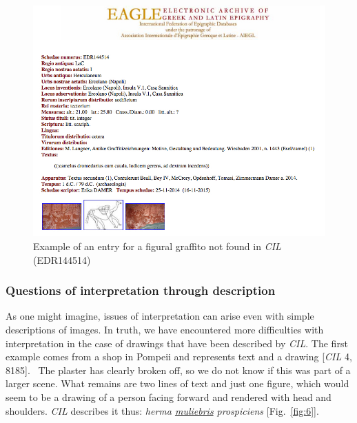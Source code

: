 \documentclass[amsthm,ebook]{saparticle}
\begin{document}
\begin{figure}[!bp]
\centering
 \includegraphics[width=\columnwidth]{EAGLE2016BenefielSypniewski-img005.jpg}
\caption{Example of an entry for a figural graffito not found in \emph{CIL} (EDR144514)}
\label{fig:5}
\end{figure}



\subsubsection{Questions of interpretation through description}


As one might imagine, issues of interpretation can arise even with simple descriptions of images. In truth, we have
encountered more difficulties with interpretation in the case of drawings that have been described by \emph{CIL}. The first
example comes from a shop in Pompeii and represents text and a drawing [\emph{CIL} 4, 8185]. \ The plaster has clearly broken
off, so we do not know if this was part of a larger scene. What remains are two lines of text and just one figure,
which would seem to be a drawing of a person facing forward and rendered with head and shoulders. \emph{CIL} describes it
thus: \emph{herma \underline{muliebris} prospiciens} [Fig.~\ref{fig:6}].
\end{document}
